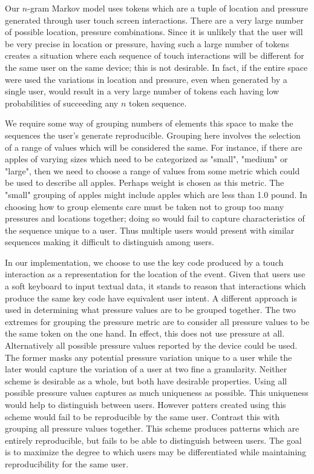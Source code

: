 Our $n$-gram Markov model uses tokens
which are a tuple of location and pressure
generated through user touch screen interactions. 
There are a very large number of possible
location, pressure combinations.
Since it is unlikely that the user will be
very precise in location or pressure,
having such a large number of tokens
creates a situation where each sequence of 
touch interactions will be different
for the same user on the same device;
this is not desirable.
In fact, if the entire space were used 
the variations in location and pressure,
even when generated by a single user,
would result in a very large number of tokens
each having low probabilities of succeeding any
$n$ token sequence.

We require some way of grouping numbers of elements this space
to make the sequences the user's generate reproducible.
%
Grouping here involves the selection of
a range of values which will be considered the same.
%
For instance, 
if there are apples of varying sizes
which need to be categorized as "small", "medium" or "large",
then we need to choose a range of values 
from some metric which could be used to describe all apples.
Perhaps weight is chosen as this metric.
The "small" grouping of apples might include
apples which are less than 1.0 pound.
%
In choosing how to group elements
care must be taken not to group too many 
pressures and locations together;
doing so would fail to capture characteristics
of the sequence unique to a user.
Thus multiple users would present with similar sequences
making it difficult to distinguish among users.

In our implementation,
we choose to use the key code produced by 
a touch interaction as a representation 
for the location of the event.
Given that users use a soft keyboard to input
textual data, it stands to reason that
interactions which produce the same key code have equivalent user intent.
%
A different approach is used in determining
what pressure values are to be grouped together.
The two extremes for grouping the pressure metric 
are to consider all pressure values to be the same token on the one hand.
In effect, this does not use pressure at all.
Alternatively all possible pressure values reported
by the device could be used.
The former masks any potential pressure variation unique to a user while
the later would capture the variation of a user at two fine a granularity.
Neither scheme is desirable as a whole, but both have desirable properties.
%
Using all possible pressure values captures
as much uniqueness as possible.
This uniqueness would help to distinguish between users.
However patters created using this scheme would 
fail to be reproducible by the same user.
Contrast this with grouping all pressure values together. 
This scheme produces patterns which are entirely reproducible, but
fails to be able to distinguish between users.
%
The goal is to maximize the degree to which users
may be differentiated while maintaining
reproducibility for the same user.


